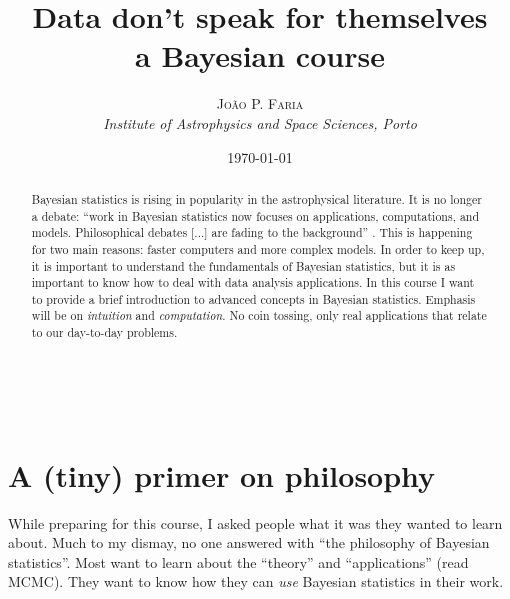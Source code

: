 \documentclass[a4paper,11pt]{article}
\title{\textbf{Data don't speak for themselves}\\ %
a Bayesian course} %
\author{\textsc{João P. Faria} %
\\{\textit{Institute of Astrophysics and Space Sciences, Porto}}} %
\date{\today} %
\makeatletter
\renewcommand{\maketitle}{ %
\begin{flushright} %
{\LARGE\@title} %

\vspace{50pt} %

{\large\@author} %
\\\@date %

\vspace{40pt} %
\end{flushright}
}
\makeatother
\begin{document}
\maketitle %



\begin{abstract}
Bayesian statistics is rising in popularity in the astrophysical literature. 
It is no longer a debate: ``work in Bayesian statistics now focuses on applications, computations, and models. Philosophical debates [...] are fading to the background'' \cite{Gelman2014}. 
This is happening for two main reasons: faster computers and more complex models. 
In order to keep up, it is important to understand the fundamentals of Bayesian statistics, but it is as important to know how to deal with data analysis applications. 
In this course I want to provide a brief introduction to advanced concepts in Bayesian statistics.
Emphasis will be on \emph{intuition} and \emph{computation}.
No coin tossing, only real applications that relate to our day-to-day problems. 
\end{abstract}


\vspace{30pt} %

\tableofcontents



\newpage
\section*{A (tiny) primer on philosophy}

While preparing for this course, I asked people what it was they wanted to learn about.
Much to my dismay, no one answered with ``the philosophy of Bayesian statistics''.
Most want to learn about the ``theory'' and ``applications'' (read MCMC).
They want to know how they can \emph{use} Bayesian statistics in their work.
\end{document}
